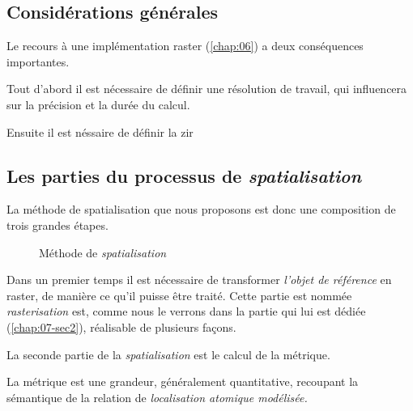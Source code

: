 \subsection{Considérations générales}

Le recours à une implémentation raster (\autoref{chap:06}) a deux conséquences importantes. 

Tout d'abord il est nécessaire de définir une résolution de travail, qui influencera sur la précision et la durée du calcul.

Ensuite il est néssaire de définir la \ac{zir}


\subsection{Les parties du processus de \emph{spatialisation}}


La méthode de spatialisation que nous proposons est donc une composition de trois grandes étapes.


\begin{figure}
  \centering
  
  \caption{Méthode de \emph{spatialisation}}
  \label{fig:methodo_spatialisation}
\end{figure}

%
Dans un premier temps il est nécessaire de
transformer \emph{l'objet de référence} en raster, de manière ce qu'il
puisse être traité. Cette partie est nommée \emph{rasterisation} est,
comme nous le verrons dans la partie qui lui est dédiée
(\autoref{chap:07-sec2}), réalisable de plusieurs façons.

%
La seconde partie de la \emph{spatialisation} est le calcul de la métrique.

La métrique est une grandeur, généralement quantitative, recoupant la sémantique de la relation de \emph{localisation atomique modélisée.}

